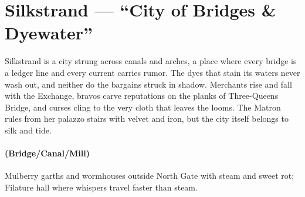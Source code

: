 \section{Silkstrand --- ``City of Bridges \& Dyewater''}
\label{chap:silkstrand}

\begin{tcolorbox}[colback=black!3,colframe=black!40!white,title={Theme \& Atmosphere}]
Silkstrand is a city strung across canals and arches, a place where every bridge is a ledger line and every current carries rumor. The dyes that stain its waters never wash out, and neither do the bargains struck in shadow. Merchants rise and fall with the Exchange, bravos carve reputations on the planks of Three-Queens Bridge, and curses cling to the very cloth that leaves the looms. The Matron rules from her palazzo stairs with velvet and iron, but the city itself belongs to silk and tide.
\end{tcolorbox}

\paragraph*{(Bridge/Canal/Mill)} Mulberry garths and wormhouses outside North Gate with steam and sweet rot; Filature hall where whispers travel faster than steam.

